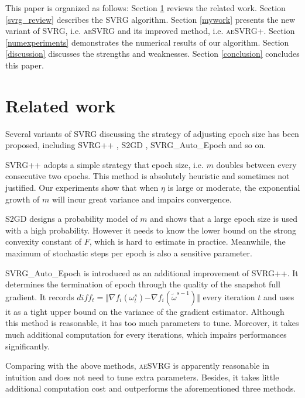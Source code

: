 \documentclass[conference]{IEEEtran}
\begin{document}
This paper is organized as follows: Section \ref{sectiove_related_work} reviews the related work. Section \ref{svrg_review} describes the SVRG algorithm. Section \ref{mywork} presents the new variant of SVRG, i.e. \textsc{aeSVRG} and its improved method, i.e. \textsc{aeSVRG+}. Section \ref{numexperiments} demonstrates the numerical results of our algorithm. Section \ref{discussion} discusses the strengths and weaknesses.
Section \ref{conclusion} concludes this paper.



\section{Related work}
\label{sectiove_related_work}
Several variants of SVRG  discussing the strategy of adjusting epoch size has been proposed, including SVRG++ \citep{Allen2015Improved}, S2GD \citep{Richtarik:2013te}, SVRG\_Auto\_Epoch \citep{Allen2015Improved} and so on. 

SVRG++ adopts a simple strategy that epoch size, i.e. $m$ doubles between every consecutive two epochs. This method is absolutely heuristic and sometimes not justified. Our experiments show that when $\eta$ is large or moderate, the exponential growth of $m$ will incur great variance and impairs convergence. 

S2GD designs a probability model of $m$ and shows that a large epoch size is used with a high probability. However it needs to know the lower bound on the strong convexity constant of $F$, which is hard to estimate in practice. Meanwhile, the maximum of stochastic steps per epoch is also a sensitive parameter.

SVRG\_Auto\_Epoch is introduced as an additional improvement of SVRG++. It determines the termination of epoch through the quality of the snapshot full gradient. It records $diff_t = \Vert\nabla f_{i}(\omega_t^s)\mathrm{-}\nabla f_{i}(\tilde{\omega}^{s-1})\Vert$ every iteration $t$ and uses it as a tight upper bound on the variance of the gradient estimator. Although this method is reasonable, it has too much parameters to tune. Moreover, it takes much additional computation for every iterations, which impairs performances significantly. 

Comparing with the above methods, \textsc{aeSVRG} is apparently reasonable in intuition and does not need to tune extra parameters. Besides, it takes little additional computation cost and outperforms the aforementioned three methods.
\end{document}
